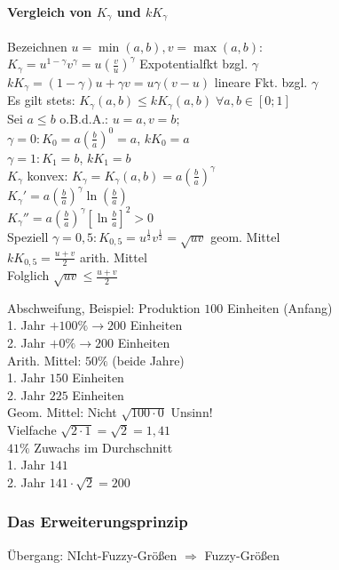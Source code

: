 \documentclass[a4paper]{scrartcl}
\begin{document}
\paragraph{Vergleich von $K_\gamma$ und $kK_\gamma$}
Bezeichnen $u = \min (a,b), v= \max (a,b):$\\
$K_\gamma = u^{1-\gamma} v^\gamma = u (\frac{v}{u} )^\gamma$ Expotentialfkt bzgl. $\gamma$\\
$kK_\gamma = (1-\gamma) u + \gamma v = u \gamma (v-u)$ lineare Fkt. bzgl. $\gamma$\\
Es gilt stets: $K_\gamma (a,b) \leq kK_\gamma (a,b) \; \forall a,b \in [0;1]$\\
Sei $a \leq b$ o.B.d.A.: $ u=a, v=b;$\\
$\gamma = 0: K_0 = a (\frac{b}{a})^0  = a$, $kK_0 = a$\\
$\gamma = 1: K_1 = b$, $kK_1 = b$\\
$K_\gamma$ konvex: $ K_\gamma = K_\gamma (a,b) = a(\frac{b}{a})^\gamma$ \\
$K_\gamma' = a(\frac{b}{a})^\gamma \ln{(\frac{b}{a})}$\\
$K_\gamma'' = a(\frac{b}{a})^\gamma [ \ln{\frac{b}{a}}]^2 > 0$\\

Speziell $\gamma = 0,5 : K_{0,5} = u^{\frac{1}{2}} v^{\frac{1}{2}} = \sqrt{uv}$ geom. Mittel\\
$kK_{0,5} = \frac{u+v}{2}$ arith. Mittel\\
Folglich $\sqrt{uv} \leq \frac{u+v}{2}$

Abschweifung, Beispiel: Produktion $100$ Einheiten (Anfang)\\
1. Jahr $+ 100 \% \to 200$ Einheiten\\
2. Jahr $+ 0 \% \to 200$ Einheiten\\
Arith. Mittel: $50 \%$ (beide Jahre)\\
1. Jahr $150$ Einheiten\\
2. Jahr $225$ Einheiten\\
Geom. Mittel: Nicht $\sqrt{100 \cdot 0}$ Unsinn!\\
Vielfache $\sqrt{2 \cdot 1} = \sqrt{2} = 1,41$\\
$41 \%$ Zuwachs im Durchschnitt\\
1. Jahr $141$\\
2. Jahr $141 \cdot \sqrt{2} = 200$

\subsubsection{Das Erweiterungsprinzip}
Übergang: NIcht-Fuzzy-Größen $\Rightarrow$ Fuzzy-Größen
\end{document}
